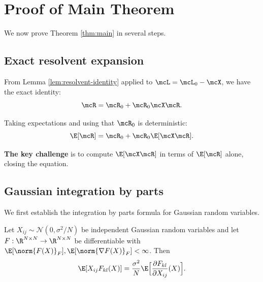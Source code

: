 
\section{Proof of Main Theorem}

We now prove Theorem \ref{thm:main} in several steps.

\subsection{Exact resolvent expansion}

From Lemma \ref{lem:resolvent-identity} applied to $\mcL = \mcL_0 - \mcX$, we have the exact identity:
\begin{equation}\label{eq:exact-expansion}
\mcR = \mcR_0 + \mcR_0 \mcX \mcR.
\end{equation}

Taking expectations and using that $\mcR_0$ is deterministic:
\begin{equation}\label{eq:expectation-expansion}
\E[\mcR] = \mcR_0 + \mcR_0 \E[\mcX \mcR].
\end{equation}

\textbf{The key challenge} is to compute $\E[\mcX \mcR]$ in terms of $\E[\mcR]$ alone, closing the equation.

\subsection{Gaussian integration by parts}

We first establish the integration by parts formula for Gaussian random variables.

\begin{lemma}\label{lem:stein}
Let $X_{ij} \sim \mathcal{N}(0, \sigma^2/N)$ be independent Gaussian random variables and let $F : \R^{N \times N} \to \R^{N \times N}$ be differentiable with $\E[\norm{F(X)}_F], \E[\norm{\nabla F(X)}_F] < \infty$. Then
\begin{equation}
\E[X_{ij} F_{kl}(X)] = \frac{\sigma^2}{N} \E\Bigl[\frac{\partial F_{kl}}{\partial X_{ij}}(X)\Bigr].
\end{equation}
\end{lemma}

